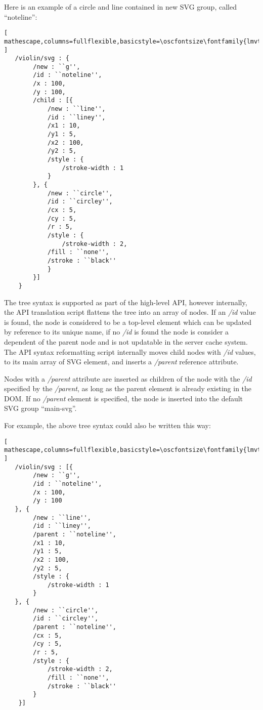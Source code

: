 Here is an example of a circle and line contained in new SVG group, called ``noteline'':

\begin{lstlisting}[ mathescape,columns=fullflexible,basicstyle=\oscfontsize\fontfamily{lmvtt}\selectfont ]
   /violin/svg : {
        /new : ``g'',
        /id : ``noteline'',
        /x : 100,
        /y : 100,
        /child : [{
      	    /new : ``line'',
            /id : ``liney'',
      	    /x1 : 10,
      	    /y1 : 5,
      	    /x2 : 100,
      	    /y2 : 5,
      	    /style : {
      	        /stroke-width : 1
      	    }
      	}, {
      	    /new : ``circle'',
            /id : ``circley'',
      	    /cx : 5,
      	    /cy : 5,
      	    /r : 5,
      	    /style : {
      	        /stroke-width : 2,
      		/fill : ``none'',
      		/stroke : ``black''
      	    }
        }]
    }
\end{lstlisting}

The tree syntax is supported as part of the high-level API, however internally, the API translation script flattens the tree into an array of nodes. 
If an \textit{/id} value is found, the node is considered to be a top-level element which can be updated by reference to its unique name, if no \textit{/id} is found the node is consider a dependent of the parent node and is not updatable in the server cache system.
The API syntax reformatting script internally moves child nodes with \textit{/id} values, to its main array of SVG element, and inserts a \textit{/parent} reference attribute.

Nodes with a \textit{/parent} attribute are inserted as children of the node with the \textit{/id} specified by the \textit{/parent}, as long as the parent element is already existing in the DOM.
If no \textit{/parent} element is specified, the node is inserted into the default SVG group ``main-svg''.

\begin{minipage}{\linewidth}
For example, the above tree syntax could also be written this way:

\begin{lstlisting}[ mathescape,columns=fullflexible,basicstyle=\oscfontsize\fontfamily{lmvtt}\selectfont ]
   /violin/svg : [{
        /new : ``g'',
        /id : ``noteline'',
        /x : 100,
        /y : 100
   }, {
        /new : ``line'',
        /id : ``liney'',
        /parent : ``noteline'',
        /x1 : 10,
        /y1 : 5,
        /x2 : 100,
        /y2 : 5,
        /style : {
            /stroke-width : 1
      	}
   }, {
        /new : ``circle'',
        /id : ``circley'',
        /parent : ``noteline'',
        /cx : 5,
        /cy : 5,
        /r : 5,
        /style : {
            /stroke-width : 2,
            /fill : ``none'',
            /stroke : ``black''
        }
    }]
\end{lstlisting}
\end{minipage}


